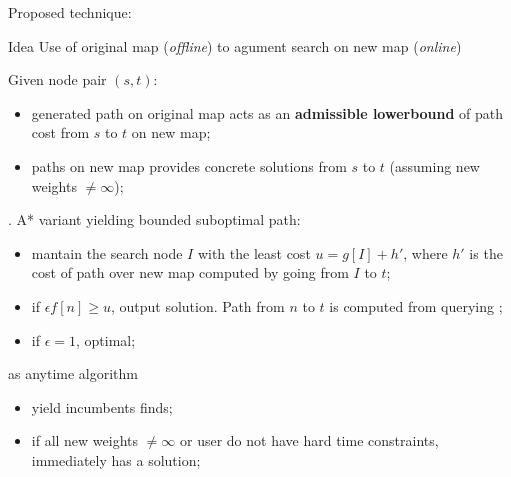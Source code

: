 \begin{frame}{Proposed technique: \CPDSearch{}}
    \begin{block}{Idea}
        Use \CPD{} of original map (\textit{offline}) to agument search on new map (\textit{online})
    \end{block}
    
    Given node pair $(s, t)$:
    \begin{itemize}
        \item \CPD{} generated path on original map acts as an \textbf{admissible lowerbound}
        of path cost from $s$ to $t$ on new map;
        \item \CPD{} paths on new map provides concrete solutions from $s$ to $t$ (assuming new weights $\not = \infty$);
    \end{itemize}

    \textbf{\CPDSearch{}}. A* variant yielding bounded suboptimal path:
    \begin{itemize}
        \item mantain the search node $I$ with the least cost $u = g[I] + h'$, where $h'$ is the cost of path over new map computed by \CPD{} going from $I$ to $t$;
        \item if $\epsilon f[n] \geq u$, output solution. Path from $n$ to $t$ is computed from querying \CPD{};
        \item if $\epsilon = 1$, \CPDSearch{} optimal;
    \end{itemize}
    
\end{frame}

\begin{frame}{\CPDSearch{} as anytime algorithm}
    \begin{itemize}
        \item yield incumbents \CPDSearch{} finds;
        \item if all new weights $\not = \infty$ or user do not have hard time constraints, \CPDSearch{} immediately has a solution;
    \end{itemize}
\end{frame}